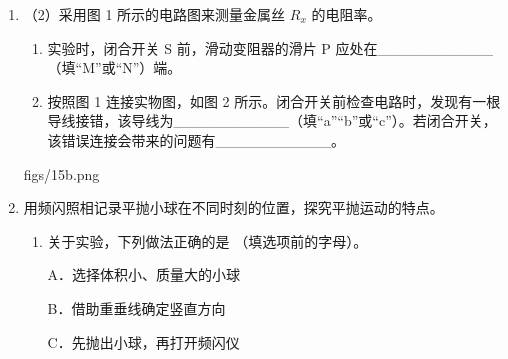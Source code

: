 \documentclass[\gkver]{gaokaozhenti}
\begin{document}
\begin{enumerate}
\item[]
（2）采用图 1 所示的电路图来测量金属丝 $R_{x}$ 的电阻率。
\begin{enumerate}[label=\protect\Circled{\arabic*}]
	\item
	实验时，闭合开关 S 前，滑动变阻器的滑片 P 应处在\_\_\_\_\_\_\_\_\_\_\_（填“M”或“N”）端。
	\item
	按照图 1 连接实物图，如图 2 所示。闭合开关前检查电路时，发现有一根导线接错，该导线为\_\_\_\_\_\_\_\_\_\_\_（填“a”“b”或“c”）。若闭合开关，该错误连接会带来的问题有\_\_\_\_\_\_\_\_\_\_\_。
\end{enumerate}
{figs/15b.png}

\item
用频闪照相记录平抛小球在不同时刻的位置，探究平抛运动的特点。
\begin{enumerate}
	\item
	关于实验，下列做法正确的是  （填选项前的字母）。

	A．选择体积小、质量大的小球

	B．借助重垂线确定竖直方向

	C．先抛出小球，再打开频闪仪


\end{enumerate}
\end{enumerate}
\end{document}
